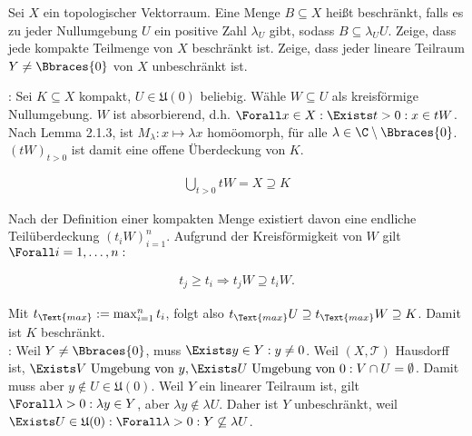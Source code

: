 \begin{exercise}

Sei $X$ ein topologischer Vektorraum.
Eine Menge $B \subseteq X$ heißt beschränkt, falls es zu jeder Nullumgebung $U$ ein positive Zahl $\lambda_U$ gibt, sodass $B \subseteq \lambda_U U$.
Zeige, dass jede kompakte Teilmenge von $X$ beschränkt ist. Zeige, dass jeder lineare Teilraum $Y \neq \Bbraces{0}$ von $X$ unbeschränkt ist.

\end{exercise}

\begin{solution}

\phantom{}

:
Sei $K \subseteq X$ kompakt, $U \in \mathfrak{U}(0)$ beliebig.
Wähle $W \subseteq U$ als kreisförmige Nullumgebung.
$W$ ist absorbierend, d.h. $\Forall x \in X: \Exists t > 0: x \in tW$.
Nach Lemma 2.1.3, ist $M_\lambda: x \mapsto \lambda x$ homöomorph, für alle $ \lambda \in \C \setminus \Bbraces{0}$.
$(tW)_{t > 0}$ ist damit eine offene Überdeckung von $K$.

\begin{align*}
  \bigcup_{t > 0} tW = X \supseteq K
\end{align*}

Nach der Definition einer kompakten Menge existiert davon eine endliche Teilüberdeckung $(t_i W)_{i=1}^n$.
Aufgrund der Kreisförmigkeit von $W$ gilt $\Forall i = 1, \ldots, n:$

\begin{align*}
  t_j \geq t_i
  \Rightarrow
  t_j W \supseteq t_i W.
\end{align*}

Mit $t_\Text{max} := \max_{i=1}^n t_i$, folgt also $t_\Text{max} U \supseteq t_\Text{max} W \supseteq K$.
Damit ist $K$ beschränkt. \\

:
Weil $Y \neq \Bbraces{0}$, muss $\Exists y \in Y: y \neq 0$. Weil $(X, \mathcal{T})$ Hausdorff ist, $\Exists V \text{ Umgebung von } y, \Exists U \text{ Umgebung von } 0: V \cap U = \emptyset$.
Damit muss aber $y \notin U \in \mathfrak{U}(0)$.
Weil $Y$ ein linearer Teilraum ist, gilt $\Forall \lambda > 0: \lambda y \in Y$, aber $\lambda y \notin \lambda U$.
Daher ist $Y$ unbeschränkt, weil $\Exists U \in \mathfrak{U}(0): \Forall \lambda > 0: Y \not \subseteq \lambda U$.

\end{solution}
